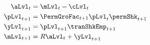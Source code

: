   \begin{equation*}\begin{gathered}\begin{aligned}
        \aLvl_{t}  & = \mLvl_{t}-\cLvl_{t}
        \\      \pLvl_{t+1}  & = \PermGroFac_{t+1}\pLvl_{t}\permShk_{t+1}
        \\      \yLvl_{t+1}  & = \pLvl_{t+1}\tranShkEmp _{t+1}
        \\      \mLvl_{t+1}  & = R \aLvl_{t}+\yLvl_{t+1}
      \end{aligned}\end{gathered}\end{equation*}
